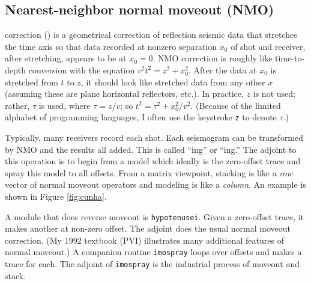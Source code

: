 % 




\subsection{Nearest-neighbor normal moveout (NMO)}
\par
{}
correction () is a geometrical correction
of reflection seismic data
that stretches the time axis so that data recorded
at nonzero separation $x_0$ of shot and receiver,
after stretching, appears to be at $x_0=0$.
NMO correction is roughly like time-to-depth conversion
with the equation $v^2 t^2 = z^2 + x_0^2$.
After the data at $x_0$ is stretched from $t$ to $z$,
it should look like stretched data from any other $x$
(assuming these are plane horizontal reflectors, etc.).
In practice, $z$ is not used; rather,
 $\tau$ is used,
where $\tau =z/v$;
so $t^2 = \tau^2+x_0^2/v^2$.
(Because of the limited alphabet of programming languages,
I often use the keystroke {\tt z} to denote $\tau$.)


\par
Typically, many receivers record each shot.
Each seismogram can be transformed by NMO
and the results all added.
This is called ``ing'' or ``ing.''
The adjoint to this operation is to begin from
a model which ideally is the zero-offset trace
and spray this model to all offsets.
From a matrix viewpoint, stacking is like a {\em  row} vector
of normal moveout operators and modeling is like a {\em  column}.
An example is shown in Figure \ref{fig:cunha}.

\par
A module that does reverse moveout is \texttt{hypotenusei}.
Given a zero-offset trace, it makes another at non-zero offset.
The adjoint does the usual normal moveout correction.
(My 1992 textbook (PVI) illustrates many additional features of normal moveout.)
A companion routine \texttt{imospray}
loops over offsets and makes a trace for each.
The adjoint of {\tt imospray} is the industrial process of moveout and stack.

